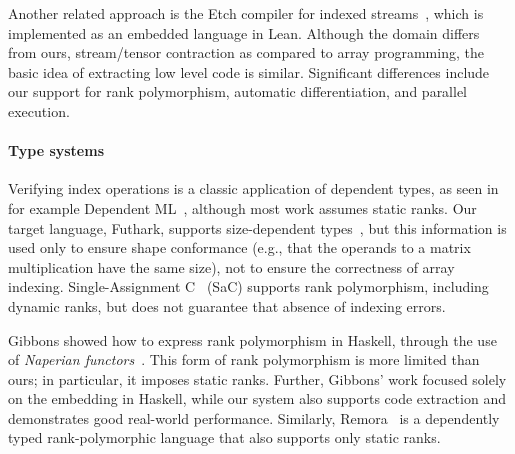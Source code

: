 Another related approach is the Etch compiler for indexed
streams~\cite{10.1145/3591268}, which is implemented as an embedded
language in Lean. Although the domain differs from ours, stream/tensor
contraction as compared to array programming, the basic idea of
extracting low level code is similar. Significant differences include
our support for rank polymorphism, automatic differentiation, and
parallel execution.

\paragraph{Type systems}

Verifying index operations is a classic application of dependent
types, as seen in for example Dependent
ML~\cite{10.1145/292540.292560}, although most work assumes static
ranks. Our target language, Futhark, supports size-dependent
types~\cite{10.1145/3609024.3609412}, but this information is used
only to ensure shape conformance (e.g., that the operands to a matrix
multiplication have the same size), not to ensure the correctness of
array indexing. Single-Assignment C~\cite{sac2} (SaC) supports rank
polymorphism, including dynamic ranks, but does not guarantee that
absence of indexing errors.

Gibbons showed how to express rank polymorphism in Haskell, through
the use of \emph{Naperian functors}~\cite{10.1145/2976022.2976023}.
This form of rank polymorphism is more limited than ours; in
particular, it imposes static ranks. Further, Gibbons' work focused
solely on the embedding in Haskell, while our system also supports
code extraction and demonstrates good real-world performance.
Similarly, Remora~\cite{rank-poly} is a dependently typed
rank-polymorphic language that also supports only static ranks.
